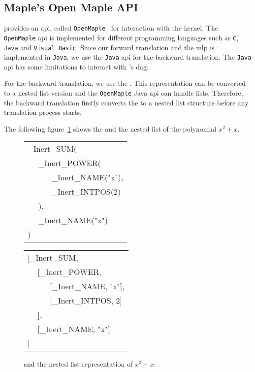 \subsection{Maple's Open Maple API}
\Maple{} provides an \gls{api}, called \texttt{OpenMaple}~\cite[\S 14.3]{MAPLE:ProgrammingGuide} for interaction with the \Maple{} kernel. The \texttt{OpenMaple} \gls{api} is implemented for different programming languages such as \texttt{C}, \texttt{Java} and \texttt{Visual Basic}. Since our forward translation and the \gls{mlp} is implemented in \texttt{Java}, we use the \texttt{Java} \gls{api} for the backward translation. The \texttt{Java} \gls{api} has some limitations to interact with \Maple's \gls{dag}.

For the backward translation, we use the \inertF. This representation can be converted to a nested list version and the \texttt{OpenMaple} Java \gls{api} can handle lists. Therefore, the backward translation firstly converts the \inertF{} to a nested list structure before any translation process starts.

The following figure~\ref{fig:inertform-list} shows the \inertF{} and the nested list of the polynomial $x^2+x$.

\begin{figure}[ht]
\centering
\begin{minipage}{.45\linewidth}
\centering
\begin{tabular}{lll}
\multicolumn{3}{l}{\_Inert\_SUM(}\\
& \multicolumn{2}{l}{\_Inert\_POWER(}\\
& & \_Inert\_NAME("x"),\\
& & \_Inert\_INTPOS(2)\\
& ),\\ 
& \multicolumn{2}{l}{\_Inert\_NAME("x")}\\
)
\end{tabular}
\end{minipage}
\begin{minipage}{.45\linewidth}
\centering
\begin{tabular}{lll}
\multicolumn{3}{l}{[\_Inert\_SUM,}\\
& \multicolumn{2}{l}{[\_Inert\_POWER, }\\
& & [\_Inert\_NAME, "x"],\\
& & [\_Inert\_INTPOS, 2]\\
& ],\\ 
& \multicolumn{2}{l}{[\_Inert\_NAME, "x"]}\\
]
\end{tabular}
\end{minipage}
\caption{\inertF{} and the nested list representation of $x^2+x$.}
\label{fig:inertform-list}
\end{figure}

